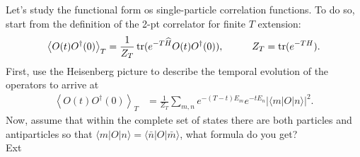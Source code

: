 Let's study the functional form os single-particle correlation functions. To do so, start from the definition of the 2-pt correlator for finite $T$ extension:
\begin{equation}
\left\langle O(t) O^\dagger(0)\right\rangle_T=\frac{1}{Z_T} \operatorname{tr}(e^{-T \widehat{H}} O(t) O^\dagger(0)),\hspace{1.cm} Z_T=\operatorname{tr}(e^{-T H}).
\end{equation}
First, use the Heisenberg picture to describe the temporal evolution of the operators to arrive at 
\begin{align}
\left\langle O(t) O^\dagger(0)\right\rangle_T&=\frac{1}{Z_T}\sum_{m,n}e^{-(T-t) E_m} e^{-t E_n}|\langle m | O |n\rangle|^2.
\end{align}
Now, assume that within the complete set of states there are both particles and antiparticles so that $\langle m | O |n\rangle=\langle \bar n | O |\bar m\rangle$, what formula do you get? \\
Ext